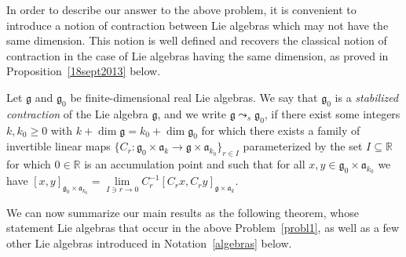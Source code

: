 \documentclass[
reqno]{amsart}
\begin{document}
In order to describe our answer to the above problem, 
it is convenient to introduce a notion of contraction between Lie algebras 
which may not have the same dimension. 
This notion is well defined and recovers the classical notion of contraction 
in the case of Lie algebras having the same dimension, 
as proved in Proposition~\ref{18sept2013} below. 

\begin{definition}\label{contr_def}
\normalfont 
Let ${{\mathfrak g}}$ and ${{\mathfrak g}}_0$ be finite-dimensional real Lie algebras. 
We say that ${{\mathfrak g}}_0$ is a \emph{stabilized contraction} of the Lie algebra ${{\mathfrak g}}$, and we write ${{\mathfrak g}}{\leadsto}_s{{\mathfrak g}}_0$, 
if there exist some integers $k,k_0\ge 0$ with $k+\dim{{\mathfrak g}}=k_0+\dim{{\mathfrak g}}_0$ 
for which there exists a family of invertible linear maps $\{C_r\colon{{\mathfrak g}}_0\times{{\mathfrak a}}_k\to{{\mathfrak g}}\times{{\mathfrak a}}_{k_0}\}_{r\in I}$ parameterized 
by the set $I\subseteq{{\mathbb R}}$ for which $0\in{{\mathbb R}}$ is an accumulation point and such that 
for all $x,y\in{{\mathfrak g}}_0\times{{\mathfrak a}}_{k_0}$ we have 
$[x,y]_{{{\mathfrak g}}_0\times{{\mathfrak a}}_{k_0}}=\lim\limits_{I\ni r\to 0}C_r^{-1}[C_rx,C_ry]_{{{\mathfrak g}}\times{{\mathfrak a}}_k}$. 
\end{definition}

We can now summarize our main results as the following theorem, 
whose statement Lie algebras that occur in the above Problem~\ref{probl1}, 
as well as a few other Lie algebras introduced in Notation~\ref{algebras} below. 
\end{document}
